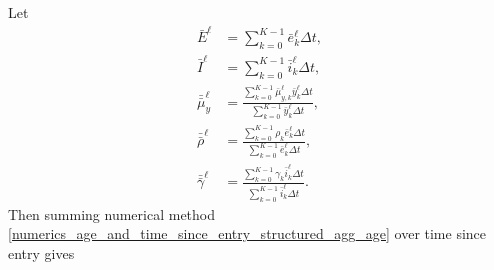 \documentclass[USenglish]{article}
\begin{document}
Let
\begin{subequations}
  \begin{align}
    \bar{E}^{\ell}
    &= \sum_{k = 0}^{K - 1} \bar{e}_k^{\ell} \Delta t,
    \\
    \bar{I}^{\ell}
    &= \sum_{k = 0}^{K - 1} \bar{i}_k^{\ell} \Delta t,
    \\
    \bar{\bar{\mu}}_y^{\ell}
    &= \frac{
      \sum_{k = 0}^{K - 1} \bar{\mu}_{y, k}^{\ell} \bar{y}_k^{\ell} \Delta t
    }{
      \sum_{k = 0}^{K - 1} \bar{y}_k^{\ell} \Delta t
    },
    \\
    \bar{\bar{\rho}}^{\ell}
    &= \frac{\sum_{k = 0}^{K - 1} \rho_k \bar{e}_k^{\ell} \Delta t}
    {\sum_{k = 0}^{K - 1} \bar{e}_k^{\ell} \Delta t},
    \\
    \bar{\bar{\gamma}}^{\ell}
    &= \frac{\sum_{k = 0}^{K - 1} \gamma_k \bar{i}_k^{\ell} \Delta t}
    {\sum_{k = 0}^{K - 1} \bar{i}_k^{\ell} \Delta t}.
  \end{align}
\end{subequations}
Then summing numerical method
\eqref{numerics_age_and_time_since_entry_structured_agg_age} over
time since entry gives
\end{document}
